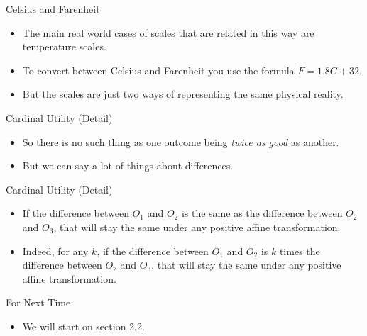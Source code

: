 \documentclass[
  ignorenonframetext,
]{beamer}
\providecommand{\tightlist}{%
  \setlength{\itemsep}{0pt}\setlength{\parskip}{0pt}}
\begin{document}
\begin{frame}{Celsius and Farenheit}
\protect\hypertarget{celsius-and-farenheit}{}
\begin{itemize}
\tightlist
\item
  The main real world cases of scales that are related in this way are
  temperature scales.
\item
  To convert between Celsius and Farenheit you use the formula
  \(F = 1.8C + 32\).
\item
  But the scales are just two ways of representing the same physical
  reality.
\end{itemize}
\end{frame}

\begin{frame}{Cardinal Utility (Detail)}
\protect\hypertarget{cardinal-utility-detail-2}{}
\begin{itemize}
\tightlist
\item
  So there is no such thing as one outcome being \emph{twice as good} as
  another.
\item
  But we can say a lot of things about differences.
\end{itemize}
\end{frame}

\begin{frame}{Cardinal Utility (Detail)}
\protect\hypertarget{cardinal-utility-detail-3}{}
\begin{itemize}[<+->]
\tightlist
\item
  If the difference between \(O_1\) and \(O_2\) is the same as the
  difference between \(O_2\) and \(O_3\), that will stay the same under
  any positive affine transformation.
\item
  Indeed, for any \(k\), if the difference between \(O_1\) and \(O_2\)
  is \(k\) times the difference between \(O_2\) and \(O_3\), that will
  stay the same under any positive affine transformation.
\end{itemize}
\end{frame}

\begin{frame}{For Next Time}
\protect\hypertarget{for-next-time}{}
\begin{itemize}
\tightlist
\item
  We will start on section 2.2.
\end{itemize}
\end{frame}
\end{document}
